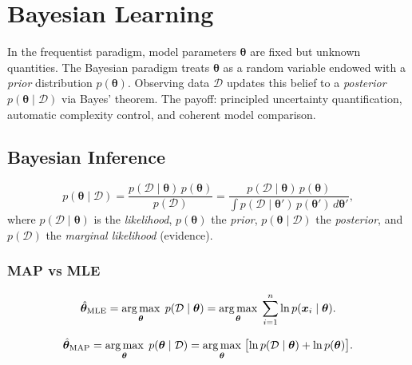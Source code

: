\chapter{Bayesian Learning}
\label{ch:bayesian}

\begin{intuition}[title=\textbf{Parameters as Random Variables}]
In the frequentist paradigm, model parameters $\bm{\theta}$ are fixed but unknown quantities. The Bayesian paradigm treats $\bm{\theta}$ as a random variable endowed with a \emph{prior} distribution $p(\bm{\theta})$. Observing data $\mathcal{D}$ updates this belief to a \emph{posterior} $p(\bm{\theta}\mid\mathcal{D})$ via Bayes' theorem. The payoff: principled uncertainty quantification, automatic complexity control, and coherent model comparison.
\end{intuition}

\section{Bayesian Inference}

\begin{theorem}
\[
  p(\bm{\theta}\mid\mathcal{D})
  = \frac{p(\mathcal{D}\mid\bm{\theta})\,p(\bm{\theta})}{p(\mathcal{D})}
  = \frac{p(\mathcal{D}\mid\bm{\theta})\,p(\bm{\theta})}
    {\displaystyle\int p(\mathcal{D}\mid\bm{\theta}')\,p(\bm{\theta}')\,d\bm{\theta}'},
\]
where $p(\mathcal{D}\mid\bm{\theta})$ is the \emph{likelihood}, $p(\bm{\theta})$ the \emph{prior}, $p(\bm{\theta}\mid\mathcal{D})$ the \emph{posterior}, and $p(\mathcal{D})$ the \emph{marginal likelihood} (evidence).
\end{theorem}

\subsection{MAP vs MLE}

\begin{definition}
\[
  \hat{\bm{\theta}}_{\text{MLE}} = \operatorname*{arg\,max}_{\bm{\theta}}\; p(\mathcal{D}\mid\bm{\theta})
  = \operatorname*{arg\,max}_{\bm{\theta}}\; \sum_{i=1}^n \ln p(\bm{x}_i\mid\bm{\theta}).
\]
\end{definition}

\begin{definition}
\[
  \hat{\bm{\theta}}_{\text{MAP}} = \operatorname*{arg\,max}_{\bm{\theta}}\; p(\bm{\theta}\mid\mathcal{D})
  = \operatorname*{arg\,max}_{\bm{\theta}}\; \bigl[\ln p(\mathcal{D}\mid\bm{\theta}) + \ln p(\bm{\theta})\bigr].
\]
\end{definition}

